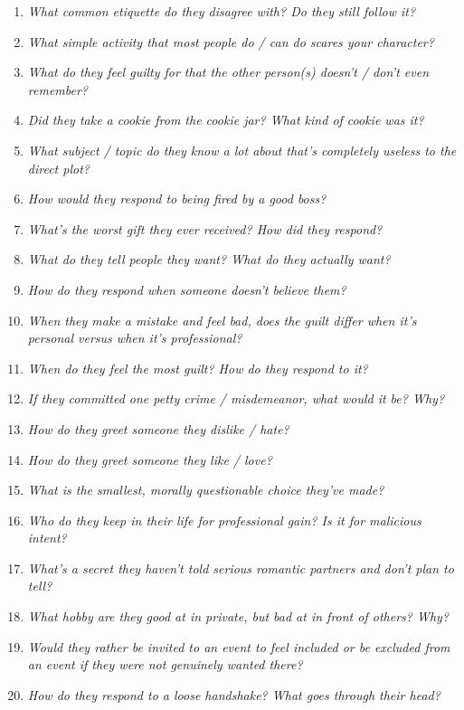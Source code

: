 \begin{enumerate}
    \item\textit{What common etiquette do they disagree with? Do they still follow it?}
    \item\textit{What simple activity that most people do / can do scares your character?}
    \item\textit{What do they feel guilty for that the other person(s) doesn’t / don’t even remember?}
    \item\textit{Did they take a cookie from the cookie jar? What kind of cookie was it?}
    \item\textit{What subject / topic do they know a lot about that’s completely useless to the direct plot?}
    \item\textit{How would they respond to being fired by a good boss?}
    \item\textit{What’s the worst gift they ever received? How did they respond?}
    \item\textit{What do they tell people they want? What do they actually want?}
    \item\textit{How do they respond when someone doesn’t believe them?}
    \item\textit{When they make a mistake and feel bad, does the guilt differ when it’s personal versus when it’s professional?}
    \item\textit{When do they feel the most guilt? How do they respond to it?}
    \item\textit{If they committed one petty crime / misdemeanor, what would it be? Why?}
    \item\textit{How do they greet someone they dislike / hate?}
    \item\textit{How do they greet someone they like / love?}
    \item\textit{What is the smallest, morally questionable choice they’ve made?}
    \item\textit{Who do they keep in their life for professional gain? Is it for malicious intent?}
    \item\textit{What’s a secret they haven’t told serious romantic partners and don’t plan to tell?}
    \item\textit{What hobby are they good at in private, but bad at in front of others? Why?}
    \item\textit{Would they rather be invited to an event to feel included or be excluded from an event if they were not genuinely wanted there?}
    \item\textit{How do they respond to a loose handshake? What goes through their head?}

\end{enumerate}
